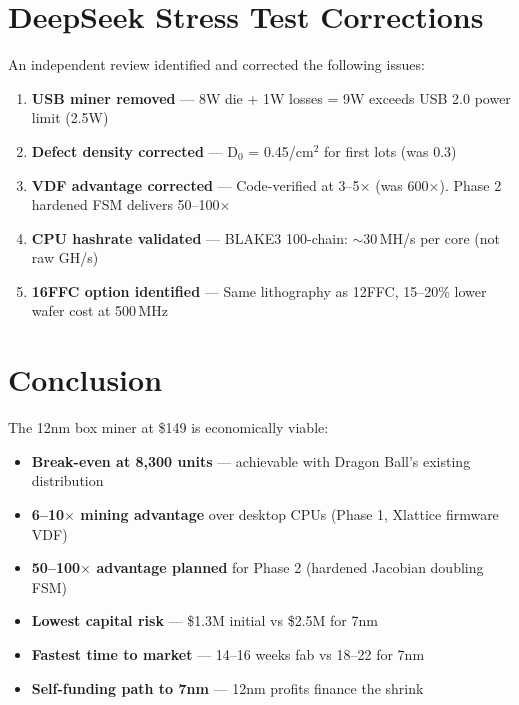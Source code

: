\documentclass[11pt,a4paper]{article}
\begin{document}
\section{DeepSeek Stress Test Corrections}

An independent review identified and corrected the following issues:

\begin{enumerate}
    \item \textbf{USB miner removed} --- 8W die + 1W losses = 9W exceeds USB 2.0 power limit (2.5W)
    \item \textbf{Defect density corrected} --- D$_0$ = 0.45/cm$^2$ for first lots (was 0.3)
    \item \textbf{VDF advantage corrected} --- Code-verified at 3--5$\times$ (was 600$\times$). Phase 2 hardened FSM delivers 50--100$\times$
    \item \textbf{CPU hashrate validated} --- BLAKE3 100-chain: $\sim$30\,MH/s per core (not raw GH/s)
    \item \textbf{16FFC option identified} --- Same lithography as 12FFC, 15--20\% lower wafer cost at 500\,MHz
\end{enumerate}

\section{Conclusion}

The 12nm box miner at \$149 is economically viable:

\begin{itemize}
    \item \textbf{Break-even at 8,300 units} --- achievable with Dragon Ball's existing distribution
    \item \textbf{6--10$\times$ mining advantage} over desktop CPUs (Phase 1, Xlattice firmware VDF)
    \item \textbf{50--100$\times$ advantage planned} for Phase 2 (hardened Jacobian doubling FSM)
    \item \textbf{Lowest capital risk} --- \$1.3M initial vs \$2.5M for 7nm
    \item \textbf{Fastest time to market} --- 14--16 weeks fab vs 18--22 for 7nm
    \item \textbf{Self-funding path to 7nm} --- 12nm profits finance the shrink
\end{itemize}
\end{document}
